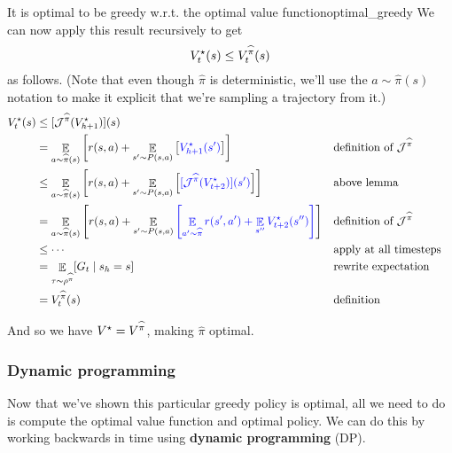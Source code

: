 \documentclass[\main/main]{subfiles}
\begin{document}
\begin{theorem}{It is optimal to be greedy w.r.t. the optimal value function}{optimal_greedy}
    We can now apply this result recursively to get
    \[
    V^\star_t(s) \le V^{\widehat \pi}_t(s)
    \]
    as follows. (Note that even though $\hat \pi$ is deterministic, we'll use the $a \sim \hat \pi(s)$ notation to make it explicit that we're sampling a trajectory from it.)
    \begin{align*}
    V_{t}^{\star}(s) &\le [\mathcal{J}^{\widehat \pi}(V_{h+1}^{\star})](s) \\
    &= \mathop{\mathbb{E}}_{a \sim \widehat \pi(s)} \left[ r(s, a) + \mathop{\mathbb{E}}_{s' \sim P(s, a)} \left[ {\color{blue} V_{h+1}^{\star}(s')} \right] \right] && \text{definition of } \mathcal{J}^{\widehat \pi} \\
    &\le \mathop{\mathbb{E}}_{a \sim \widehat \pi(s)} \left[ r(s, a) + \mathop{\mathbb{E}}_{s' \sim P(s, a)} \left[ {\color{blue}[ \mathcal{J}^{\widehat \pi} (V_{t+2}^{\star})] (s')} \right] \right] && \text{above lemma} \\
    &= \mathop{\mathbb{E}}_{a \sim \widehat \pi(s)} \left[ r(s, a) + \mathop{\mathbb{E}}_{s' \sim P(s, a)}{\color{blue} \left[ \mathop{\mathbb{E}}_{a' \sim \widehat \pi}  r(s', a') + \mathop{\mathbb{E}}_{s''} V_{t+2}^{\star}(s'') \right]} \right] && \text{definition of } \mathcal{J}^{\widehat \pi} \\
    &\le \cdots && \text{apply at all timesteps} \\
    &= \mathop{\mathbb{E}}_{\tau \sim \rho^{\widehat \pi}} [G_{t} \mid s_h = s] && \text{rewrite expectation} \\
    &= V_{t}^{\widehat \pi}(s) && \text{definition}
    \end{align*}

    And so we have $V^\star = V^{\widehat \pi}$, making $\hat \pi$ optimal.
\end{theorem}


\subsubsection{Dynamic programming}

Now that we've shown this particular greedy policy is optimal, all we need to do is compute the optimal value function and optimal policy. We can do this by working backwards in time using \textbf{dynamic programming} (DP).
\end{document}
